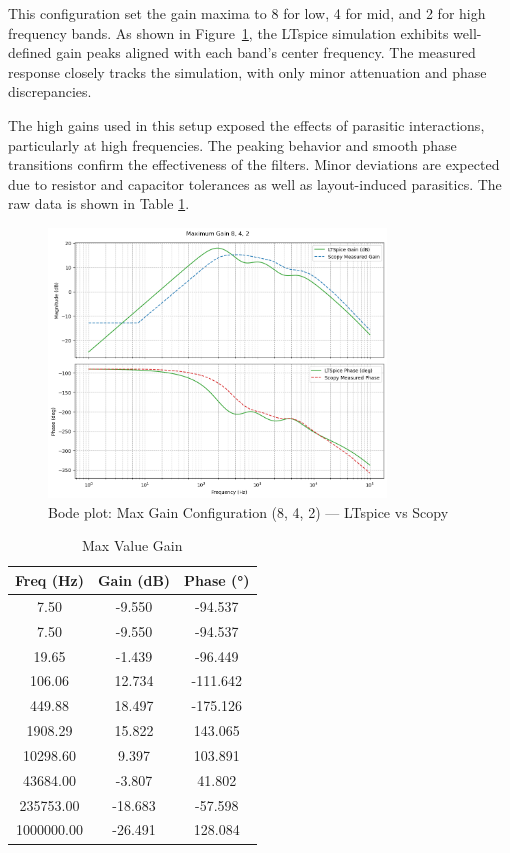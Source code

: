 \documentclass[12pt]{article}
\begin{document}
This configuration set the gain maxima to 8 for low, 4 for mid, and 2 for high frequency bands. As shown in Figure~\ref{fig:maxvalue}, the LTspice simulation exhibits well-defined gain peaks aligned with each band's center frequency. The measured response closely tracks the simulation, with only minor attenuation and phase discrepancies.

The high gains used in this setup exposed the effects of parasitic interactions, particularly at high frequencies. The peaking behavior and smooth phase transitions confirm the effectiveness of the filters. Minor deviations are expected due to resistor and capacitor tolerances as well as layout-induced parasitics. The raw data is shown in Table \ref{tab:maxvalue}.

\begin{figure}[H]
	\centering
	\includegraphics[width=0.8\textwidth]{dp2max.png}
	\caption{Bode plot: Max Gain Configuration (8, 4, 2) — LTspice vs Scopy}
	\label{fig:maxvalue}
\end{figure}
\begin{table}[H]
	\centering
	\begin{tabular}{|c|c|c|}
		\hline
		\textbf{Freq (Hz)} & \textbf{Gain (dB)} & \textbf{Phase (°)} \\
		\hline
		7.50               & -9.550             & -94.537            \\
		7.50               & -9.550             & -94.537            \\
		19.65              & -1.439             & -96.449            \\
		106.06             & 12.734             & -111.642           \\
		449.88             & 18.497             & -175.126           \\
		1908.29            & 15.822             & 143.065            \\
		10298.60           & 9.397              & 103.891            \\
		43684.00           & -3.807             & 41.802             \\
		235753.00          & -18.683            & -57.598            \\
		1000000.00         & -26.491            & 128.084            \\
		\hline
	\end{tabular}
	\caption{Max Value Gain}
	\label{tab:maxvalue}
\end{table}
\end{document}
